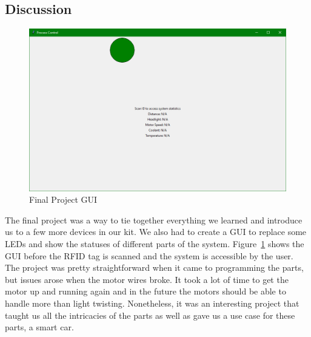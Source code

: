 \documentclass[12pt,titlepage]{article}
\begin{document}
\subsection{Discussion}
\begin{figure}[!htb]
  \centering
  \includegraphics[width=5in]{final_project/gui.png}
  \caption{Final Project GUI}\label{fig:final_gui}
\end{figure}
The final project was a way to tie together everything we learned and introduce us to a few more devices in our kit. We also
had to create a GUI to replace some LEDs and show the statuses of different parts of the system. Figure~\ref{fig:final_gui}
shows the GUI before the RFID tag is scanned and the system is accessible by the user. The project was pretty straightforward
when it came to programming the parts, but issues arose when the motor wires broke. It took a lot of time to get the motor
up and running again and in the future the motors should be able to handle more than light twisting. Nonetheless, it was an
interesting project that taught us all the intricacies of the parts as well as gave us a use case for these parts, a smart car.
\end{document}
